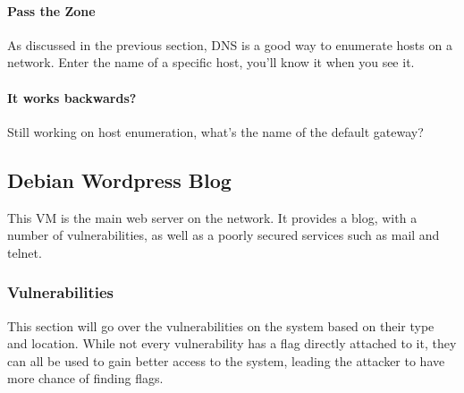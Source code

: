 				\paragraph{Pass the Zone}
					As discussed in the previous section, DNS is a good way to enumerate hosts on a network. 
					Enter the name of a specific host, you'll know it when you see it. 

				\paragraph{It works backwards?}
					Still working on host enumeration, what's the name of the default gateway?

		\subsection{Debian Wordpress Blog}
			This VM is the main web server on the network. 
			It provides a blog, with a number of vulnerabilities, as well as a poorly secured services such as mail and telnet. 


			\subsubsection{Vulnerabilities}
				This section will go over the vulnerabilities on the system based on their type and location. 
				While not every vulnerability has a flag directly attached to it, they can all be used to gain better access to the system, leading the attacker to have more chance of finding flags. 

